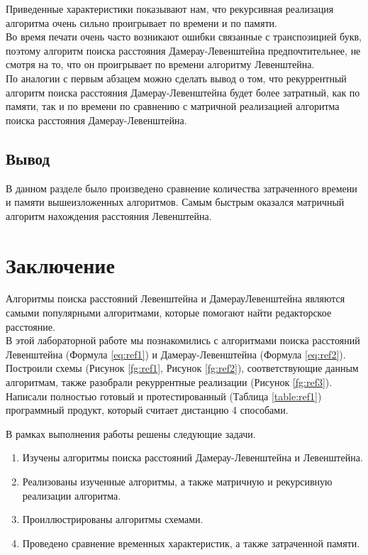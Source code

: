 \documentclass[12pt,a4paper]{report}
\begin{document}
Приведенные характеристики показывают нам, что рекурсивная реализация алгоритма очень сильно проигрывает по времени и по памяти.\\
Во время печати очень часто возникают ошибки связанные с транспозицией букв, поэтому алгоритм поиска расстояния Дамерау-Левенштейна предпочтительнее, не смотря на то, что он проигрывает по времени алгоритму Левенштейна.\\
По аналогии с первым абзацем можно сделать вывод о том, что рекуррентный алгоритм поиска расстояния Дамерау-Левенштейна будет более затратный, как по памяти, так и по времени по сравнению с матричной реализацией алгоритма поиска расстояния Дамерау-Левенштейна.


\section{Вывод}

В данном разделе было произведено сравнение количества затраченного времени и памяти вышеизложенных алгоритмов.
Самым быстрым оказался матричный алгоритм нахождения расстояния Левенштейна.

\newpage
\chapter*{Заключение}

Алгоритмы поиска расстояний Левенштейна и ДамерауЛевенштейна являются самыми популярными алгоритмами, которые помогают найти редакторское расстояние. \\
В этой лабораторной работе мы познакомились с алгоритмами поиска расстояний Левенштейна (Формула \ref{eq:ref1}) и Дамерау-Левенштейна (Формула \ref{eq:ref2}).
Построили схемы (Рисунок \ref{fg:ref1}, Рисунок \ref{fg:ref2}), соответствующие данным алгоритмам, также разобрали рекуррентные реализации (Рисунок \ref{fg:ref3}).
Написали полностью готовый и протестированный (Таблица \ref{table:ref1}) программный продукт, который считает дистанцию 4 способами.



В рамках выполнения работы решены следующие задачи.

\begin{enumerate}
	\item Изучены алгоритмы поиска расстояний Дамерау-Левенштейна и Левенштейна.
	\item Реализованы изученные алгоритмы, а также матричную и рекурсивную реализации алгоритма.
	\item Проиллюстрированы алгоритмы схемами.
	\item Проведено сравнение временных характеристик, а также затраченной памяти.
\end{enumerate}
\end{document}

